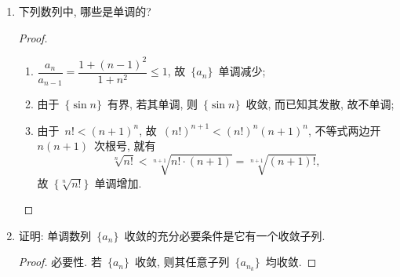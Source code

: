 \documentclass[UTF8,a4paper,11pt,twoside]{book}
\begin{document}
\begin{enumerate}
\begin{proof}
\begin{equation*}
\begin{split}
				      =&\left(\dfrac{2}{1^2}\right)\left(\dfrac{2\cdot4}{3^2}\right)\left(\dfrac{4\cdot6}{5^2}\right)\cdots\left(\dfrac{(2n-2)(2n)}{(2n-1)^2}\right)\cdot\dfrac{2n}{2n+1}\leqslant2.
			      \end{split}
		      \end{equation*}
		      其中用到了基本不等式~$(2n-2)(2n)\leqslant\left(\dfrac{(2n-2)+(2n)}{2}\right)^2=(2n-1)^2$, 即~$\dfrac{(2n-2)(2n)}{(2n-1)^2}\leqslant 1$, 于是~$\{a_n\}$~有上界; 又由
		      \[
			      \dfrac{a_n}{a_{n-1}}=\left(\dfrac{2n}{2n-1}\right)^2\dfrac{2n-1}{2n+1}=\dfrac{4n^2}{4n^2-1}\geqslant 1.
		      \]
		      故~$\{a_n\}$~单调增加. 由单调有界原理知~$\{a_n\}$~收敛.\qedhere

	      \end{proof}
	\item 下列数列中, 哪些是单调的?
	      \begin{tabenum}[(1)]
		      \item $\left\{\dfrac{1}{1+n^2}\right\}$; \item $\{\sin{n}\}$;	\item $\{\sqrt[n]{n!}\}$.
	      \end{tabenum}
	      \begin{proof}
		      \begin{enumerate}[(1)]
			      \item $\dfrac{a_n}{a_{n-1}}=\dfrac{1+(n-1)^2}{1+n^2}\leqslant 1$, 故~$\{a_n\}$~单调减少;
			      \item 由于~$\{\sin{n}\}$~有界, 若其单调, 则~$\{\sin{n}\}$~收敛, 而已知其发散, 故不单调;
			      \item 由于~$n!<(n+1)^n$, 故~$(n!)^{n+1}<(n!)^n(n+1)^n$, 不等式两边开~$n(n+1)$~次根号, 就有
			            \[
				            \sqrt[n]{n!}<\sqrt[n+1]{n!\cdot (n+1)}=\sqrt[n+1]{(n+1)!},
			            \]
			            故~$\{\sqrt[n]{n!}\}$~单调增加.\qedhere
		      \end{enumerate}
	      \end{proof}
	\item 证明: 单调数列~$\{a_n\}$~收敛的充分必要条件是它有一个收敛子列.
	      \begin{proof}
		      必要性. 若~$\{a_n\}$~收敛, 则其任意子列~$\{a_{n_k}\}$~均收敛.


\end{proof}
\end{enumerate}
\end{document}
